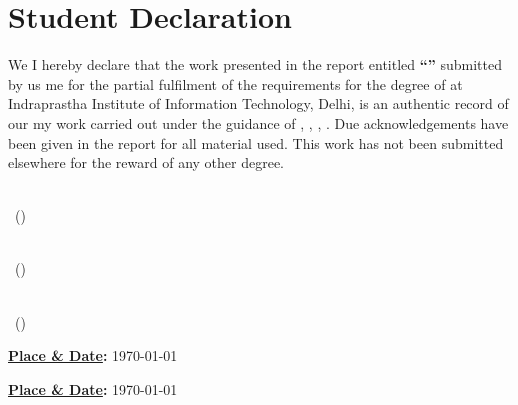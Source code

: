 
\chapter*{\centering \huge Student Declaration}

\begin{minipage}{\textwidth}
    \begin{flushleft}
        \ifdefined\twoAuthor We \else I \fi
        hereby declare that the work presented in the report entitled \textbf{``\projTitle''} submitted by
        \ifdefined\twoAuthor us \else me \fi
        for the partial fulfilment of the requirements for the degree of \textit{\prog} at
        Indraprastha Institute of Information Technology, Delhi, is an authentic record of
        \ifdefined\twoAuthor our \else my \fi
        work carried out under the guidance of
        \textbf{\advisorone}%
        \ifx\advisortwo\empty\else , \textbf{\advisortwo}\fi
        \ifx\advisorthree\empty\else , \textbf{\advisorthree}\fi
        \ifx\advisorfour\empty\else , \textbf{\advisorfour}\fi.
        Due acknowledgements have been given in the report for all material used.
        This work has not been submitted elsewhere for the reward of any other degree.

        \vspace{0.5in}

        \begin{minipage}{0.45\textwidth}
            \underline{\hspace{5.5cm}} \\[4pt]
            \projAuthorOneName\ (\projAuthorOneRollno)
        \end{minipage}%
        \hfill
        \ifdefined\twoAuthor
        \begin{minipage}{0.45\textwidth}
            \underline{\hspace{5.5cm}} \\[4pt]
            \projAuthorTwoName\ (\projAuthorTwoRollno)
        \end{minipage}
        \fi

        \ifdefined\threeAuthor
        \vspace{0.5in}

        \begin{minipage}{0.45\textwidth}
            \underline{\hspace{5.5cm}} \\[4pt]
            \projAuthorThreeName\ (\projAuthorThreeRollno)
        \end{minipage}%
        \hfill
        \begin{minipage}{0.45\textwidth}
            \textbf{\underline{Place \& Date}:} \today
        \end{minipage}
        \else
        \hfill {\textbf{\underline{Place \& Date}:} \today}
        \fi


\end{flushleft}
\end{minipage}
